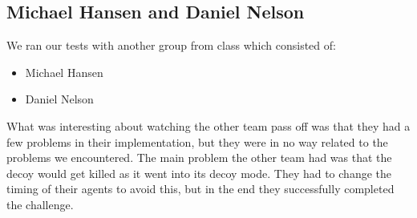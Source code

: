 \subsection{Michael Hansen and Daniel Nelson}
We ran our tests with another group from class which consisted of:
\begin{itemize}
    \item{Michael Hansen}
    \item{Daniel Nelson}
\end{itemize}
What was interesting about watching the other team pass off was that they had a few problems in their implementation, but they were in no way related to the problems we encountered.  The main problem the other team had was that the decoy would get killed as it went into its decoy mode.  They had to change the timing of their agents to avoid this, but in the end they successfully completed the challenge.